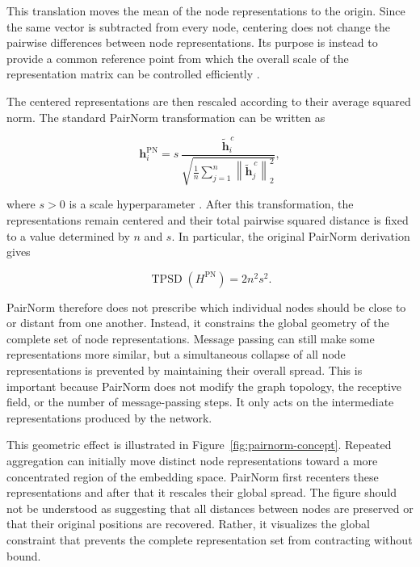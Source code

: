 \documentclass[english]{lni}
\begin{document}
This translation moves the mean of the node representations to the origin. Since the same vector is subtracted from every node,
centering does not change the pairwise differences between node representations. Its purpose is instead to provide a common reference
point from which the overall scale of the representation matrix can be controlled efficiently \cite{zhao2020pairnorm}.

The centered representations are then rescaled according to their average squared norm. The standard PairNorm transformation can be
written as

\begin{equation}
    \mathbf{h}^{\mathrm{PN}}_i
    =
    s\,
    \frac{
        \widetilde{\mathbf{h}}^{\,c}_i
    }{
        \sqrt{
            \frac{1}{n}
            \sum_{j=1}^{n}
            \left\|
                \widetilde{\mathbf{h}}^{\,c}_j
            \right\|_2^2
        }
    },
    \label{eq:pairnorm-scale}
\end{equation}

where $s>0$ is a scale hyperparameter \cite{zhao2020pairnorm}. After this transformation, the
representations remain centered and their total pairwise squared distance is fixed to a value determined by $n$ and $s$. In particular, the original PairNorm derivation gives

\begin{equation}
    \operatorname{TPSD}
    \left(
        H^{\mathrm{PN}}
    \right)
    =
    2n^2s^2 .
    \label{eq:pairnorm-tpsd-constant}
\end{equation}

PairNorm therefore does not prescribe which individual nodes should be close to or distant from one another. Instead, it constrains the global geometry of the complete set of node representations. Message passing can still make some representations more similar, but a simultaneous collapse of all node representations is prevented by maintaining their overall spread. This is important because PairNorm does not modify the graph topology, the receptive field, or the number of message-passing steps. It only acts on the intermediate representations produced by the network.

This geometric effect is illustrated in Figure~\ref{fig:pairnorm-concept}. Repeated aggregation can initially move distinct node representations toward a more concentrated region of the embedding space. PairNorm first recenters these representations and after that it rescales their global spread. The figure should not be understood as suggesting that all distances between nodes are preserved or that their original positions are recovered. Rather, it visualizes the global constraint that prevents the complete representation set from contracting without bound.
\end{document}
